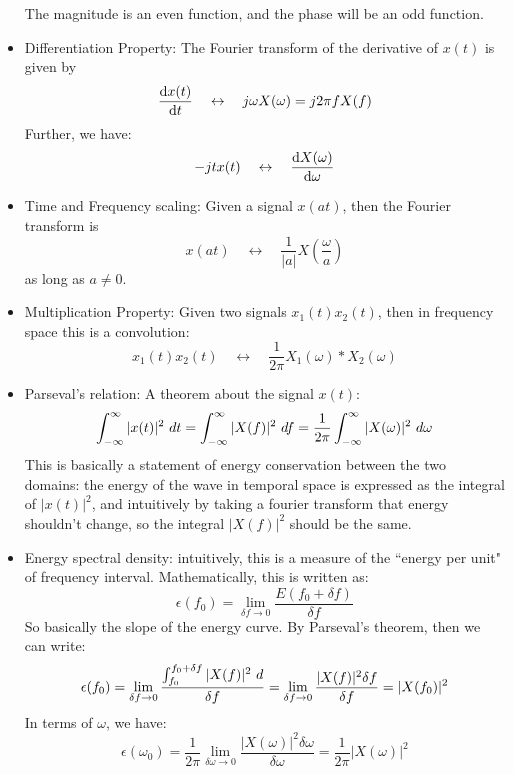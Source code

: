 \begin{itemize}
		The magnitude is an even function, and the phase will be an odd function.
	\item Differentiation Property: The Fourier transform of the derivative of \( x(t) \) is 
		given by 
		\[
			\dv{x(t)}{t} \quad \leftrightarrow \quad j \omega X(\omega) = j 2\pi f X(f)
		\] 
		Further, we have:
		\[
			-jt x(t) \quad \leftrightarrow \quad \dv{X(\omega)}{\omega}
		\] 
	\item Time and Frequency scaling: Given a signal \( x(at) \), then the Fourier transform is
		\[
		x(at) \quad \leftrightarrow \quad \frac{1}{|a|}X\left( \frac{\omega}{a} \right) 
		\] 
		as long as \( a \neq 0 \). 
	\item Multiplication Property: Given two signals \( x_1(t)x_2(t) \), then in frequency space this 
		is a convolution:
		\[
		x_1(t) x_2(t) \quad \leftrightarrow \quad \frac{1}{2\pi}X_1(\omega) * X_2(\omega)
		\] 
	\item Parseval's relation: A theorem about the signal \( x(t) \):
		\[
		\int_{-\infty}^{\infty} |x(t)|^2 \ d t = \int_{-\infty}^{\infty} |X(f)|^2 \ d f = \frac{1}{2\pi}
		\int_{-\infty}^{\infty} |X(\omega)|^2 \ d \omega 
		\] 
		This is basically a statement of energy conservation between the two domains: the energy of the wave 
		in temporal space is expressed as the integral of \( |x(t)|^2 \), and intuitively by taking a fourier 
		transform that energy shouldn't change, so the integral \( |X(f)|^2 \) should be the same. 
	\item Energy spectral density: intuitively, this is a measure of the ``energy per unit" of frequency interval. 
		Mathematically, this is written as:
		\[
		\epsilon(f_0) = \lim_{\delta f \to 0}\frac{E(f_0 + \delta f)}{\delta f}
		\] 
		So basically the slope of the energy curve. By Parseval's theorem, then we can write:
		\[
		\epsilon(f_0) = \lim_{\delta f \to 0}\frac{\int_{f_0}^{f_0 + \delta f} |X(f)|^2 \ d  }{\delta f}
		= \lim_{\delta f\to 0}\frac{|X(f)|^2 \delta f}{\delta f} = |X(f_0)|^2
		\] 
		In terms of \( \omega \), we have:
		\[
		\epsilon(\omega_0) = \frac{1}{2\pi}\lim_{\delta \omega \to 0} \frac{|X(\omega)|^2 \delta \omega}{\delta \omega}
		= \frac{1}{2\pi}|X(\omega)|^2
		\] 
\end{itemize}


